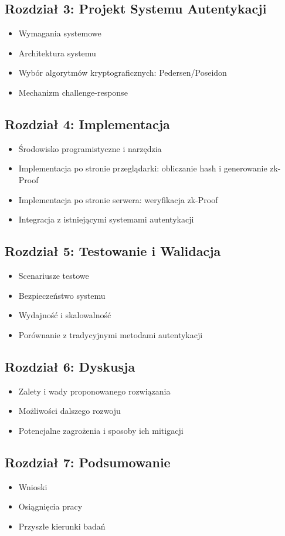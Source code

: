 \documentclass{article}
\begin{document}
\subsection{Rozdział 3: Projekt Systemu Autentykacji}
\begin{itemize}
    \item Wymagania systemowe
    \item Architektura systemu
    \item Wybór algorytmów kryptograficznych: Pedersen/Poseidon
    \item Mechanizm challenge-response
\end{itemize}

\subsection{Rozdział 4: Implementacja}
\begin{itemize}
    \item Środowisko programistyczne i narzędzia
    \item Implementacja po stronie przeglądarki: obliczanie hash i generowanie zk-Proof
    \item Implementacja po stronie serwera: weryfikacja zk-Proof
    \item Integracja z istniejącymi systemami autentykacji
\end{itemize}

\subsection{Rozdział 5: Testowanie i Walidacja}
\begin{itemize}
    \item Scenariusze testowe
    \item Bezpieczeństwo systemu
    \item Wydajność i skalowalność
    \item Porównanie z tradycyjnymi metodami autentykacji
\end{itemize}

\subsection{Rozdział 6: Dyskusja}
\begin{itemize}
    \item Zalety i wady proponowanego rozwiązania
    \item Możliwości dalszego rozwoju
    \item Potencjalne zagrożenia i sposoby ich mitigacji
\end{itemize}

\subsection{Rozdział 7: Podsumowanie}
\begin{itemize}
    \item Wnioski
    \item Osiągnięcia pracy
    \item Przyszłe kierunki badań
\end{itemize}

  

\end{document}
